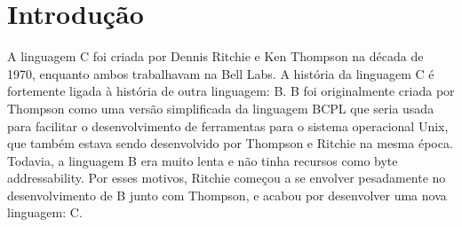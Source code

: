 \chapter*[Introdução]{Introdução}

    A linguagem C foi criada por Dennis Ritchie e Ken Thompson na década de 1970,
    enquanto ambos trabalhavam na Bell Labs. A história da linguagem C é fortemente
    ligada à história de outra linguagem: B. B foi originalmente criada por Thompson
    como uma versão simplificada da linguagem BCPL que seria usada para facilitar o
    desenvolvimento de ferramentas para o sistema operacional Unix, que também estava
    sendo desenvolvido por Thompson e Ritchie na mesma época. Todavia, a linguagem B 
    era muito lenta e não tinha recursos como byte addressability.  Por esses motivos, 
    Ritchie começou a se envolver pesadamente no desenvolvimento de B junto com Thompson,
    e acabou por desenvolver uma nova linguagem: C.
\nocite{languageC}
\nocite{DevelopmentOfTheCLanguage}
\nocite{wikipediaC}
\newpage